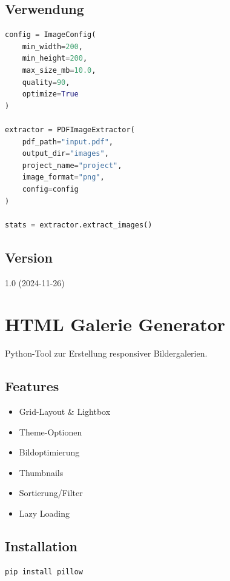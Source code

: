 \documentclass{vorlage-design-main}
\begin{document}
\subsection{Verwendung}\label{verwendung-4}

\begin{lstlisting}[language=Python]
config = ImageConfig(
    min_width=200,
    min_height=200,
    max_size_mb=10.0,
    quality=90,
    optimize=True
)

extractor = PDFImageExtractor(
    pdf_path="input.pdf",
    output_dir="images",
    project_name="project",
    image_format="png",
    config=config
)

stats = extractor.extract_images()
\end{lstlisting}

\subsection{Version}\label{version-3}

1.0 (2024-11-26)

\section{HTML Galerie Generator}\label{html-galerie-generator}

Python-Tool zur Erstellung responsiver Bildergalerien.

\subsection{Features}\label{features-4}

\begin{itemize}

\item
  Grid-Layout \& Lightbox
\item
  Theme-Optionen
\item
  Bildoptimierung
\item
  Thumbnails
\item
  Sortierung/Filter
\item
  Lazy Loading
\end{itemize}

\subsection{Installation}\label{installation-3}

\begin{lstlisting}[language=bash]
pip install pillow
\end{lstlisting}
\end{document}
